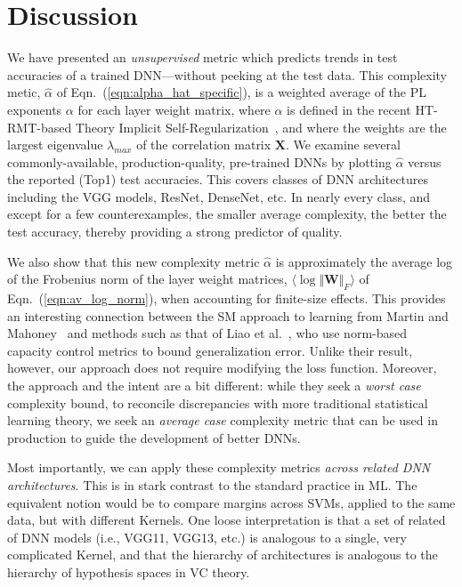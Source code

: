 \section{Discussion}
\label{sxn:discussion}

We have presented an \emph{unsupervised} metric which predicts trends in test accuracies of a trained DNN---without peeking at the test data. 
This complexity metic, $\hat{\alpha}$ of Eqn.~(\ref{eqn:alpha_hat_specific}), is a weighted average of the PL exponents $\alpha$ for each layer weight matrix, where $\alpha$ is defined in the recent HT-RMT-based Theory Implicit Self-Regularization~\cite{MM17_TR,MM18_TR}, and where the weights are the largest eigenvalue $\lambda_{max}$ of the correlation matrix $\mathbf{X}$.  
%
We examine several commonly-available, production-quality, pre-trained DNNs by plotting $\hat{\alpha}$ versus the reported (Top1) test accuracies.
This covers classes of DNN architectures including the VGG models, ResNet, DenseNet, etc. 
In nearly every class, and except for a few counterexamples, the smaller average complexity, the better the test accuracy, thereby providing a strong predictor of quality.

We also show that this new complexity metric $\hat{\alpha}$ is approximately the average log of the Frobenius norm of the layer weight matrices, $\langle\log\Vert\mathbf{W}\Vert_{F}\rangle$ of Eqn.~(\ref{eqn:av_log_norm}), when accounting for finite-size effects.
This provides an interesting connection between the SM approach to learning from Martin and Mahoney~\cite{MM17_TR,MM18_TR} and methods such as that of Liao et al.~\cite{LMBx18_TR}, who use norm-based capacity control metrics to bound generalization error.
Unlike their result, however, our approach does not require modifying the loss function.
Moreover, the approach and the intent are a bit different: while they seek a \emph{worst case} complexity bound, to reconcile discrepancies with more traditional statistical learning theory, we seek an \emph{average case} complexity metric that can be used in production to guide the development of better DNNs.

Most importantly, we can apply these complexity metrics \emph{across related DNN architectures}. 
This is in stark contrast to the standard practice in ML.
The equivalent notion would be to compare margins across SVMs, applied to the same data, but with different Kernels. 
One loose interpretation is that a set of related of DNN models (i.e., VGG11, VGG13, etc.) is analogous to a single, very complicated Kernel, and that the hierarchy of architectures is analogous to the hierarchy of hypothesis spaces in VC theory.

